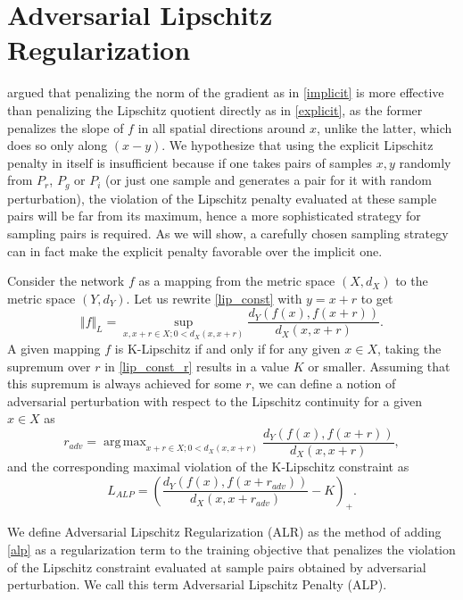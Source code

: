 \documentclass{article}
\DeclareMathOperator*{\argmax}{arg\,max}
\begin{document}
\section{Adversarial Lipschitz Regularization}
\label{alr}
\citet{Adleretal2018} argued that penalizing the norm of the gradient as in \eqref{implicit} is more effective than penalizing the Lipschitz quotient directly as in \eqref{explicit}, as the former penalizes the slope of $f$ in all spatial directions around $x$, unlike the latter, which does so only along $(x-y)$.  We hypothesize that using the explicit Lipschitz penalty in itself is insufficient because if one takes pairs of samples $x, y$ randomly from $P_r$, $P_g$ or $P_i$ (or just one sample and generates a pair for it with random perturbation), the violation of the Lipschitz penalty evaluated at these sample pairs will be far from its maximum, hence a more sophisticated strategy for sampling pairs is required. As we will show, a carefully chosen sampling strategy can in fact make the explicit penalty favorable over the implicit one.

Consider the network $f$ as a mapping from the metric space $(X, d_X)$ to the metric space $(Y, d_Y)$. Let us rewrite \eqref{lip_const} with $y=x+r$ to get
\begin{equation} \label{lip_const_r}
\Vert{f}\Vert_L=\sup_{x,x+r \in X;0 < d_X(x,x+r)}{\frac{d_Y(f(x),f(x+r))}{d_X(x,x+r)}}.
\end{equation}
A given mapping $f$ is K-Lipschitz if and only if for any given $x \in X$, taking the supremum over $r$ in \eqref{lip_const_r} results in a value $K$ or smaller. Assuming that this supremum is always achieved for some $r$, we can define a notion of adversarial perturbation with respect to the Lipschitz continuity for a given $x \in X$ as
\begin{equation} \label{alp_radv}
r_{adv}=\argmax_{x+r\in X;0 < d_X(x,x+r)}{\frac{d_Y(f(x),f(x+r))}{d_X(x,x+r)}},
\end{equation}
and the corresponding maximal violation of the K-Lipschitz constraint as
\begin{equation}\label{alp}
L_{ALP}=\left(\frac{d_Y(f(x),f(x+r_{adv}))}{d_X(x,x+r_{adv})}-K\right)_+.
\end{equation}

We define Adversarial Lipschitz Regularization (ALR) as the method of adding \eqref{alp} as a regularization term to the training objective that penalizes the violation of the Lipschitz constraint evaluated at sample pairs obtained by adversarial perturbation. We call this term Adversarial Lipschitz Penalty (ALP).
\end{document}
